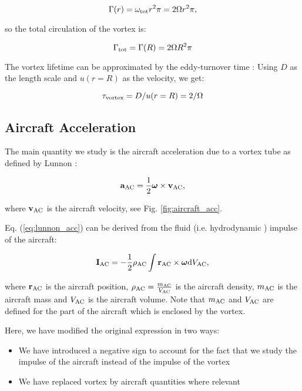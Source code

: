 \documentclass[smallextended]{svjour3}       %
\begin{document}
\begin{equation}
\Gamma(r)=\omega_{\rm tot} r^2 \pi =  2 \Omega r^2 \pi,
\end{equation}

\noindent so the total circulation of the vortex is:

\begin{equation}
\Gamma_{\rm tot} = \Gamma(R) = 2 \Omega R^2 \pi
\end{equation}

The vortex lifetime can be approximated by the eddy-turnover time \citep{pope_a}: Using $D$ as the length scale and $u(r=R)$ as the velocity, we get:

\begin{equation}
\tau_{\rm vortex}=D/u(r=R)=2/\Omega
\end{equation}

\subsection{Aircraft Acceleration}

The main quantity we study is the aircraft acceleration due to a vortex tube as defined by Lunnon \citep{lunnon_a}:

\begin{equation}
{\bf a}_{\rm AC} = \frac{1}{2} \boldsymbol\omega \times {\bf v_{\rm AC}},
\label{eq:lunnon_acc}
\end{equation}

\noindent where ${\bf v_{\rm AC}}$ is the aircraft velocity, see Fig. \ref{fig:aircraft_acc}.

Eq. (\ref{eq:lunnon_acc}) can be derived from the fluid \citep{lamb_a,batchelor_a} (i.e. hydrodynamic \citep{saffman_a}) impulse of the aircraft:

\begin{equation}
{\bf I_{\rm AC}} = - \frac{1}{2} \rho_{\rm AC} \int {\bf r_{\rm AC}} \times \boldsymbol\omega {\rm d} V_{\rm AC},
\label{eq:impulse}
\end{equation}

\noindent where ${\bf r_{\rm AC}}$ is the aircraft position, $\rho_{\rm AC}=\frac{m_{\rm AC}}{V_{\rm AC}}$ is the aircraft density, $m_{\rm AC}$ is the aircraft mass and $V_{\rm AC}$ is the aircraft volume. Note that $m_{\rm AC}$ and $V_{\rm AC}$ are defined for the part of the aircraft which is enclosed by the vortex.

Here, we have modified the original expression in two ways:
\begin{itemize}
  \item We have introduced a negative sign to account for the fact that we study the impulse of the aircraft instead of the impulse of the vortex
  \item We have replaced vortex by aircraft quantities where relevant
\end{itemize}
\end{document}
